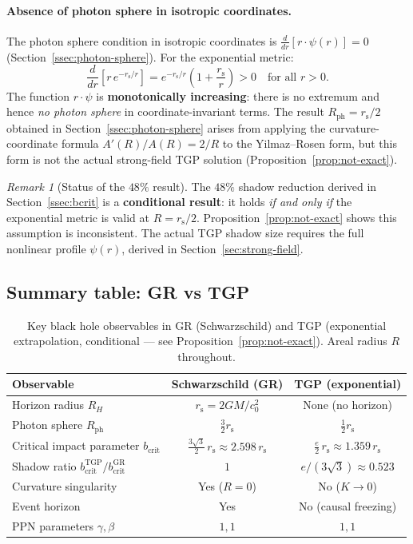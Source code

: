 \documentclass[11pt,a4paper]{article}
\theoremstyle{definition}
\theoremstyle{remark}
\newtheorem{remark}[theorem]{Remark}
\newcommand{\rs}{r_{\mathrm{s}}}
\newcommand{\bcrit}{b_{\mathrm{crit}}}
\begin{document}
\paragraph{Absence of photon sphere in isotropic coordinates.}
The photon sphere condition in isotropic coordinates is
$\frac{d}{dr}[r\cdot\psi(r)] = 0$ (Section~\ref{ssec:photon-sphere}).
For the exponential metric:
\begin{equation}
  \frac{d}{dr}\!\left[r\,e^{-\rs/r}\right]
  = e^{-\rs/r}\!\left(1 + \frac{\rs}{r}\right) > 0
  \quad\text{for all } r > 0.
\end{equation}
The function $r\cdot\psi$ is \textbf{monotonically increasing}: there is
no extremum and hence \emph{no photon sphere} in coordinate-invariant
terms.  The result $R_{\mathrm{ph}} = \rs/2$ obtained in
Section~\ref{ssec:photon-sphere} arises from applying the curvature-coordinate
formula $A'(R)/A(R) = 2/R$ to the Yilmaz--Rosen form, but this form is
not the actual strong-field TGP solution (Proposition~\ref{prop:not-exact}).

\begin{remark}[Status of the $48\%$ result]\label{rem:48pct-status}
The $48\%$ shadow reduction derived in Section~\ref{ssec:bcrit} is a
\textbf{conditional result}: it holds \emph{if and only if} the
exponential metric is valid at $R = \rs/2$.
Proposition~\ref{prop:not-exact} shows this assumption is
inconsistent.  The actual TGP shadow size requires the full
nonlinear profile $\psi(r)$, derived in Section~\ref{sec:strong-field}.
\end{remark}

\subsection{Summary table: GR vs TGP}

\begin{table}[h]
\centering
\caption{Key black hole observables in GR (Schwarzschild)
  and TGP (exponential extrapolation, conditional ---
  see Proposition~\ref{prop:not-exact}).
  Areal radius $R$ throughout.}
\label{tab:comparison}
\begin{tabular}{lcc}
\toprule
Observable & Schwarzschild (GR) & TGP (exponential) \\
\midrule
Horizon radius $R_H$
  & $\rs = 2GM/c_0^2$
  & None (no horizon) \\[4pt]
Photon sphere $R_{\mathrm{ph}}$
  & $\frac{3}{2}\rs$
  & $\frac{1}{2}\rs$ \\[4pt]
Critical impact parameter $\bcrit$
  & $\frac{3\sqrt{3}}{2}\,\rs \approx 2.598\,\rs$
  & $\frac{e}{2}\,\rs \approx 1.359\,\rs$ \\[4pt]
Shadow ratio $\bcrit^{\mathrm{TGP}}/\bcrit^{\mathrm{GR}}$
  & $1$
  & $e/(3\sqrt{3}) \approx 0.523$ \\[4pt]
Curvature singularity
  & Yes ($R = 0$)
  & No ($K \to 0$) \\[4pt]
Event horizon
  & Yes
  & No (causal freezing) \\[4pt]
PPN parameters $\gamma, \beta$
  & $1, 1$
  & $1, 1$ \\
\bottomrule
\end{tabular}
\end{table}
\end{document}
